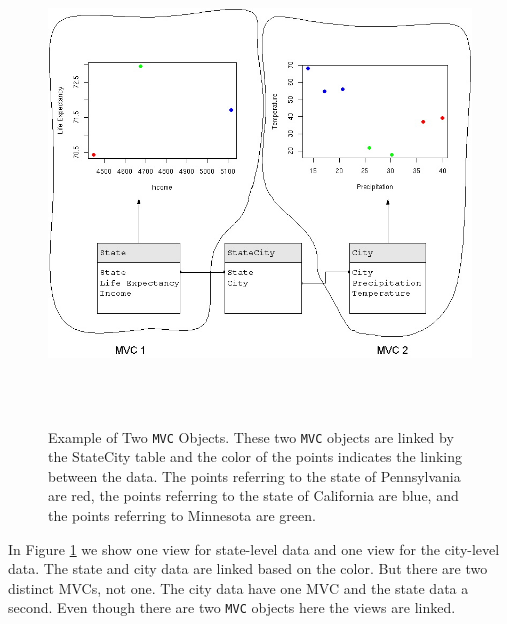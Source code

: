 \documentclass[11pt]{article}
\newcommand{\Robject}[1]{{\texttt{#1}}}
\begin{document}
\begin{figure}[ht]
  \begin{center}
    \includegraphics[height=5in, width=6in]{MultipleMVC.jpg}
    \caption{ Example of Two \Robject{MVC} Objects.  These two \Robject{MVC}
      objects are linked by the StateCity table and the color of the points
    indicates the linking between the data.  The points referring to the state
    of Pennsylvania are red, the points referring to the state of California
    are blue, and the points referring to Minnesota are green. }
    \label{Fig:MultMVC}
  \end{center}
\end{figure}

In Figure \ref{Fig:MultMVC} we show one view for state-level data and
one view for the city-level data.  The state and city data are linked
based on the color.  But there are two distinct MVCs, not one. 
The city data have one MVC and the state data a second.  Even though 
there are two \Robject{MVC} objects here the views are linked.

\end{document}
